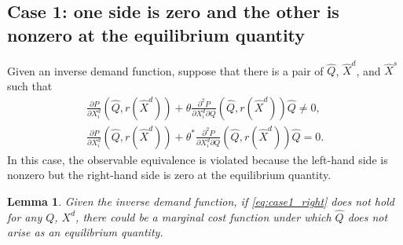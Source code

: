 \documentclass[11pt, a4paper]{article}
\newtheorem{lemma}{Lemma}
\theoremstyle{remark}
\begin{document}
\subsection{Case 1: one side is zero and the other is nonzero at the equilibrium quantity}
Given an inverse demand function, suppose that there is a pair of $\hat{Q}$, $\hat{X}^{d}$, and $\hat{X}^{s}$ such that 
\begin{align}
    \frac{\partial P}{\partial X^{d}_i}(\hat{Q}, r(\hat{X}^{d})) + \theta\frac{\partial^2 P}{\partial X^{d}_{i}\partial Q}(\hat{Q}, r(\hat{X}^{d}))\hat{Q}  \ne 0,\label{eq:case1_left}\\
    \frac{\partial P}{\partial X^{d}_i}(\hat{Q}, r(\hat{X}^{d})) + \theta^{*}\frac{\partial^2 P}{\partial X^{d}_{i}\partial Q}(\hat{Q}, r(\hat{X}^{d}))\hat{Q}  = 0.\label{eq:case1_right}
\end{align}
In this case, the observable equivalence is violated because the left-hand side is nonzero but the right-hand side is zero at the equilibrium quantity.


\begin{lemma}
    Given the inverse demand function, if \eqref{eq:case1_right} does not hold for any $Q$, $X^{d}$, there could be a marginal cost function under which $\hat{Q}$ does not arise as an equilibrium quantity.
\end{lemma}
\end{document}
